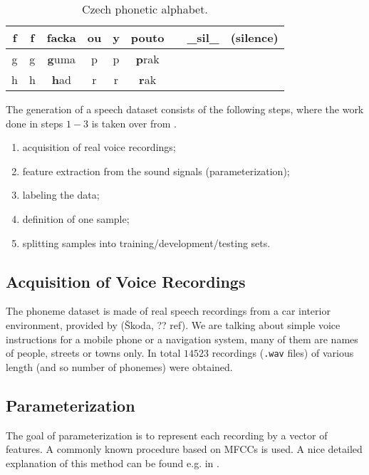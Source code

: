\begin{table}[H]
{\begin{tabular}{|c|c|c||c|c|c||c|c|c|}
f  & f                & \textbf{f}acka            & ou & y                & p\textbf{ou}to            &       & \_sil\_          & (silence)                 \\ \hline
g  & g                & \textbf{g}uma             & p  & p                & \textbf{p}rak             &       &                  &                           \\ \hline
h  & h                & \textbf{h}ad              & r  & r                & \textbf{r}ak              &       &                  &                           \\ \hline
\end{tabular}}
\caption{Czech phonetic alphabet.}
\label{tab:methods:phonetic_alphabet}
\end{table}

The generation of a speech dataset consists of the following steps, where the work done in steps $ 1-3 $ is taken over from \citep{smidl_pc}.

\begin{enumerate}
\item acquisition of real voice recordings;
\item feature extraction from the sound signals (parameterization);
\item labeling the data;
\item definition of one sample;
\item splitting samples into training/development/testing sets.
\end{enumerate}

\subsection*{Acquisition of Voice Recordings}
The phoneme dataset is made of real speech recordings from a car interior environment, provided by (Škoda, ?? ref). We are talking about simple voice instructions for a mobile phone or a navigation system, many of them are names of people, streets or towns only. In total $ 14523 $ recordings (\texttt{.wav} files) of various length (and so number of phonemes) were obtained.

\subsection*{Parameterization}
The goal of parameterization is to represent each recording by a vector of features. A commonly known procedure based on MFCCs is used. A nice detailed explanation of this method can be found e.g. in \citep{online:mfcc}. 

